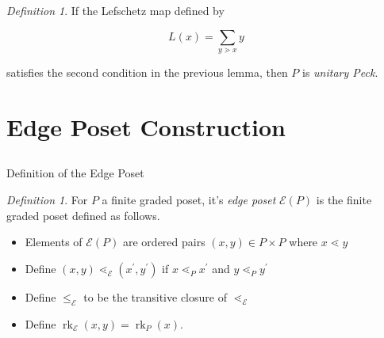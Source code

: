 \documentclass{beamer}
\theoremstyle{remark}
\newtheorem{defn}[thm]{Definition}
\newcommand\rk{\operatorname{rk}}
\begin{document}
\begin{frame}
\begin{defn}
If the Lefschetz map defined by

$$L(x) = \sum_{y\gtrdot x} y$$

satisfies the second condition in the previous lemma, then $P$ is \textit{unitary Peck}.
\end{defn}
\end{frame}









\section{Edge Poset Construction}
\subsection{}

\begin{frame}{Definition of the Edge Poset}
\begin{defn}
\label{defn:functor_of_edges}
For $P$ a finite graded poset, it's \textit{edge poset} $\mathcal{E}(P)$ is the finite graded poset defined as follows. 
\begin{itemize}

\item Elements of $\mathcal{E}(P)$ are ordered pairs $(x,y)\in P\times P$ where $x\lessdot y$

\item Define $(x,y) \lessdot_{\mathcal{E}} (x^\prime,y^\prime)$ if $x\lessdot_P x^\prime$ and $y\lessdot_P y^\prime$

\item Define $\le_{\mathcal{E}}$ to be the transitive closure of $\lessdot_{\mathcal{E}}$

\item Define $\rk_{\mathcal{E}}(x,y) = \rk_P(x)$.
\end{itemize}
\end{defn}
\end{frame}
\end{document}
